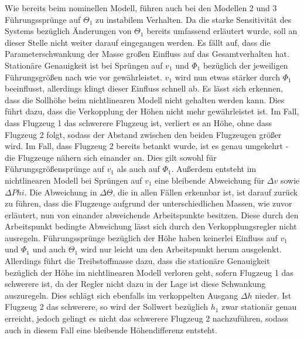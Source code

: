 Wie bereits beim nominellen Modell, führen auch bei den Modellen 2 und 3 Führungssprünge auf $\Theta_1$ zu instabilem Verhalten. Da die starke Sensitivität des Systems bezüglich Änderungen von $\Theta_1$ bereits umfassend erläutert wurde, soll an dieser Stelle nicht weiter darauf eingegangen werden. Es fällt auf, dass die Parameterschwankung der Masse großen Einfluss auf das Gesamtverhalten hat. Stationäre Genauigkeit ist bei Sprüngen auf $v_1$ und $\Phi_1$ bezüglich der jeweiligen Führungsgrößen nach wie vor gewährleistet. $v_1$ wird nun etwas stärker durch $\Phi_1$ beeinflusst, allerdings klingt dieser Einfluss schnell ab. Es lässt sich erkennen, dass die Sollhöhe beim nichtlinearen Modell nicht gehalten werden kann. Dies führt dazu, dass die Verkopplung der Höhen nicht mehr gewährleistet ist. Im Fall, dass Flugzeug 1 das schwerere Flugzeug ist, verliert es an Höhe, ohne dass Flugzeug 2 folgt, sodass der Abstand zwischen den beiden Flugzeugen größer wird. Im Fall, dass Flugzeug 2 bereits betankt wurde, ist es genau umgekehrt - die Flugzeuge nähern sich einander an. Dies gilt sowohl für Führungsgrößensprünge auf $v_1$ als auch auf $\Phi_1$. Außerdem entsteht im nichtlinearen Modell bei Sprüngen auf $v_1$ eine bleibende Abweichung für $\Delta v$ sowie $\Delta Phi$. Die Abweichung in $\Delta \Theta$, die in allen Fällen erkennbar ist, ist darauf zurück zu führen, dass die Flugzeuge aufgrund der unterschiedlichen Massen, wie zuvor erläutert, nun von einander abweichende Arbeitspunkte besitzen. Diese durch den Arbeitspunkt bedingte Abweichung lässt sich durch den Verkopplungsregler nicht ausregeln.
Führungssprünge bezüglich der Höhe haben keinerlei Einfluss auf $v_1$ und $\Phi_1$ und auch $\Theta_1$ wird nur leicht um den Arbeitspunkt herum ausgelenkt. Allerdings führt die Treibstoffmasse dazu, dass die stationäre Genauigkeit bezüglich der Höhe im nichtlinearen Modell verloren geht, sofern Flugzeug 1 das schwerere ist, da der Regler nicht dazu in der Lage ist diese Schwankung auszuregeln. Dies schlägt sich ebenfalls im verkoppelten Ausgang $\Delta h $ nieder. Ist Flugzeug 2 das schwerere, so wird der Sollwert bezüglich $h_1$ zwar stationär genau erreicht, jedoch gelingt es nicht das schwerere Flugzeug 2 nachzuführen, sodass auch in diesem Fall eine bleibende Höhendifferenz entsteht. 

